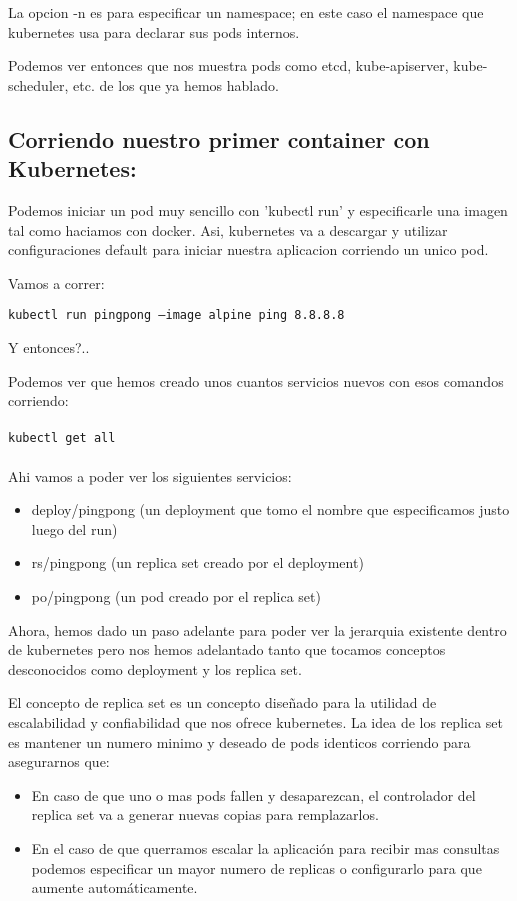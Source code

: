 \documentclass[11pt]{article} %
\begin{document}
La opcion -n es para especificar un namespace; en este caso el namespace que kubernetes usa para declarar sus pods internos.

Podemos ver entonces que nos muestra pods como etcd, kube-apiserver, kube-scheduler, etc. de los que ya hemos hablado.

\subsection{Corriendo nuestro primer container con Kubernetes:}

Podemos iniciar un pod muy sencillo con 'kubectl run' y especificarle una imagen tal como haciamos con docker. Asi, kubernetes va a descargar y utilizar configuraciones default para iniciar nuestra aplicacion corriendo un unico pod.

Vamos a correr:
\begin{center}
    \texttt{kubectl run pingpong --image alpine ping 8.8.8.8}
\end{center}

Y entonces?.. 

Podemos ver que hemos creado unos cuantos servicios nuevos con esos comandos corriendo:\\ \\
    \texttt{kubectl get all} \\ \\

Ahi vamos a poder ver los siguientes servicios:
\begin{itemize}

	\item
	deploy/pingpong (un deployment que tomo el nombre que especificamos justo luego del run)
    
    \item
    rs/pingpong (un replica set creado por el deployment)
    
    \item
    po/pingpong (un pod creado por el replica set)
\end{itemize}

Ahora, hemos dado un paso adelante para poder ver la jerarquia existente dentro de kubernetes pero nos hemos adelantado tanto que tocamos conceptos desconocidos como deployment y los replica set.

El concepto de replica set es un concepto diseñado para la utilidad de escalabilidad y confiabilidad que nos ofrece kubernetes. La idea de los replica set es mantener un numero minimo y deseado de pods identicos corriendo para asegurarnos que:
\begin{itemize}
    
	\item    
    En caso de que uno o mas pods fallen y desaparezcan, el controlador del replica set va a generar nuevas copias para remplazarlos.
    
	\item	
	En el caso de que querramos escalar la aplicación para recibir mas consultas podemos especificar un mayor numero de replicas o configurarlo para que aumente automáticamente.
\end{itemize}
\end{document}
